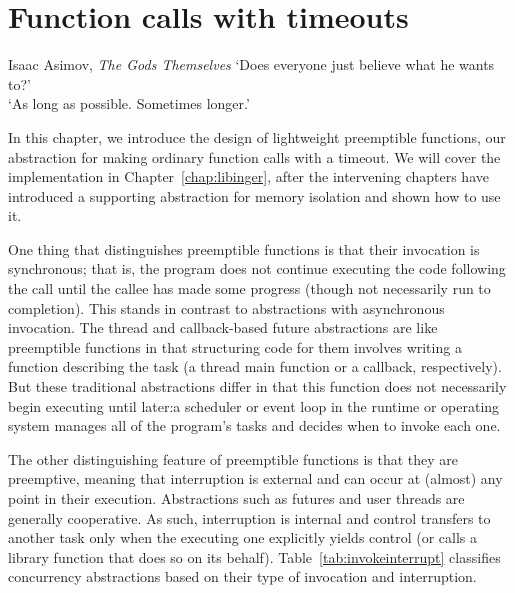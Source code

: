 \chapter{Function calls with timeouts}
\label{chap:functions}

\ifdefined\chapquotes
\begin{chapquote}{Isaac Asimov, \textit{The Gods Themselves}}
`Does everyone just believe what he wants to?' \\
`As long as possible.  Sometimes longer.'
\end{chapquote}
\fi

In this chapter, we introduce the design of lightweight preemptible functions, our
abstraction for making ordinary function calls with a timeout.  We will cover the
implementation in Chapter~\ref{chap:libinger}, after the intervening chapters have
introduced a supporting abstraction for memory isolation and shown how to use it.

One thing that distinguishes preemptible functions is that their invocation is
synchronous;
that is, the program does not continue executing the code following the call until
the callee has made some progress (though not necessarily run to completion).  This
stands in contrast to abstractions with asynchronous invocation.  The thread and
callback-based future abstractions are like preemptible functions in that structuring
code for them involves writing a function describing the task (a thread main function
or a callback, respectively).  But these traditional abstractions differ in that this
function does not necessarily
begin executing until later:\@ a scheduler or event loop in the runtime or operating
system manages all of the program's tasks and decides when to invoke each one.

The other distinguishing feature of preemptible functions is that they are
preemptive, meaning that interruption is external and can occur at (almost) any point
in their execution.  Abstractions such as futures and user threads are generally
cooperative.  As such, interruption is internal and control transfers to another task
only when the executing one explicitly yields control (or calls a library function
that does so on its behalf).  Table~\ref{tab:invokeinterrupt} classifies concurrency
abstractions based on their type of invocation and interruption.

